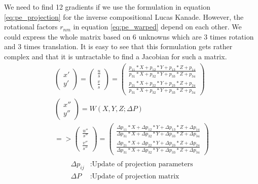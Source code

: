 \documentclass[11pt,a4paper,titlepage,oneside]{report}
\begin{document}
We need to find 12 gradients if we use the formulation in equation \ref{eq:pe_projection} for the inverse compositional Lucas Kanade. However, the rotational factors $r_{nm}$ in equation \ref{eq:pe_warped} depend on each other. We could express the whole matrix based on 6 unknowns which are 3 times rotation and 3 times translation. It is easy to see that this formulation gets rather complex and that it is untractable to find a Jacobian for such a matrix.\\
\begin{equation}\label{eq:pe_projection}
  \begin{gathered}
    \begin{pmatrix}
      x' \\
      y' 
    \end{pmatrix}=
    \begin{pmatrix}
      \frac{u}{s} \\
      \frac{v}{s} 
    \end{pmatrix}=
    \begin{pmatrix}
      \frac{p_{11}*X + p_{12}*Y + p_{13}*Z + p_{14}}{p_{31}*X + p_{32}*Y + p_{33}*Z + p_{34}}  \\
      \frac{p_{21}*X + p_{22}*Y + p_{23}*Z + p_{24}}{p_{31}*X + p_{32}*Y + p_{33}*Z + p_{34}}
    \end{pmatrix}\\
    \begin{pmatrix}
      x'' \\
      y'' 
    \end{pmatrix}=W(X,Y,Z;\Delta P)\\
    =>\begin{pmatrix}
      \frac{u''}{s''} \\
      \frac{v''}{s''} 
    \end{pmatrix}=
    \begin{pmatrix}
      \frac{\Delta p_{11}*X + \Delta p_{12}*Y + \Delta p_{13}*Z + \Delta p_{14}}{\Delta p_{31}*X + \Delta p_{32}*Y + \Delta p_{33}*Z + \Delta p_{34}}  \\
      \frac{\Delta p_{21}*X + \Delta p_{22}*Y + \Delta p_{23}*Z + \Delta p_{24}}{\Delta p_{31}*X + \Delta p_{32}*Y + \Delta p_{33}*Z + \Delta p_{34}}
    \end{pmatrix}\\
  \end{gathered}
\end{equation}
\begin{align*}
  \Delta p_{ij}   &: \text{Update of projection parameters}\\
  \Delta P        &: \text{Update of projection matrix}
\end{align*}
\end{document}
